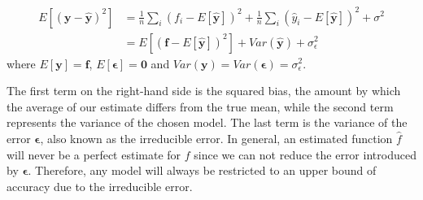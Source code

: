 \begin{align*}
E\left[\left(\boldsymbol{y}-\boldsymbol{\hat{y}}\right)^2\right] &= \frac{1}{n}\sum_i\left(f_i- E\left[\boldsymbol{\hat{y}}\right]\right)^2+\frac{1}{n}\sum_i\left(\hat{y}_i- E\left[\boldsymbol{\hat{y}}\right]\right)^2+\sigma^2 \\
&= E\left[\left(\boldsymbol{f}-E\left[\boldsymbol{\hat{y}}\right]\right)^2\right] + Var\left(\boldsymbol{\hat{y}}\right) + \sigma_{\epsilon}^2
\end{align*}
where $E[\boldsymbol{y}] = \boldsymbol{f}$, $E\left[\boldsymbol{\epsilon}\right] = \boldsymbol{0}$ and $Var\left(\boldsymbol{y}\right) = Var \left(\boldsymbol{\epsilon}\right) = \sigma_{\epsilon}^2$.
\begin{comment}
and since the variance of $\boldsymbol{y}$ and $\boldsymbol{\epsilon}$ are both equal to $\sigma^2$, we can use the relations $E[\boldsymbol{y}] = \boldsymbol{f}$, $ E[\boldsymbol{\epsilon}] = 0 $ and $Var(\boldsymbol{y}) = Var(\boldsymbol{\epsilon}) = \sigma_{\epsilon}^2$. The mean value of $\boldsymbol{\epsilon}$ is by definition equal to zero. In addition, the function $\boldsymbol{f}$ is not a stochastic variable, and the same argument can also be used for $\boldsymbol{\hat{y}}$. This allows us to insert the expression $\boldsymbol{y}$ into the cost function
\begin{align*}
E[(\boldsymbol{y-\hat{y}})^2] &= E[(\boldsymbol{f + \epsilon - \hat{y}})^2].
\end{align*}
By using the infamous trick of both adding and subtracting simultaneously, we arrive at
\begin{align*}
E\left[(\boldsymbol{y}-\boldsymbol{\hat{y}})^2\right] &= E[(\boldsymbol{f + \epsilon - \hat{y}} + E[\boldsymbol{y}] - E[\boldsymbol{y}])^2 ].
\end{align*}

And simply by using the relations mentioned above concerning the expectation value for $\boldsymbol{y}$ and the variances for both $\boldsymbol{y}$ and $\epsilon$, the cost function can be rewritten to:

\begin{align*}
E\left[(\boldsymbol{y}-\boldsymbol{\hat{y}})^2\right] &=  E[(\boldsymbol{f}-E[\boldsymbol{\hat{y}}])^2] + Var(\boldsymbol{\hat{y}}) + \sigma_{\epsilon}^2 \\
 &= \frac{1}{n}\sum_i(f_i- E\left[\boldsymbol{\hat{y}}\right])^2+\frac{1}{n}\sum_i(\hat{y}_i- E\left[\boldsymbol{\hat{y}}\right])^2+\sigma^2_{\epsilon}.
\end{align*}

\end{comment}
The first term on the right-hand side is the squared bias, the amount by which the average of our estimate differs from the true mean, while the second term represents the variance of the chosen model. The last term is the variance of the error $\boldsymbol{\epsilon}$, also known as the irreducible error. In general, an estimated function $\hat{f}$ will never be a perfect estimate for $f$ since we can not reduce the error introduced by $\boldsymbol{\epsilon}$. Therefore, any model will always be restricted to an upper bound of accuracy due to the irreducible error.

